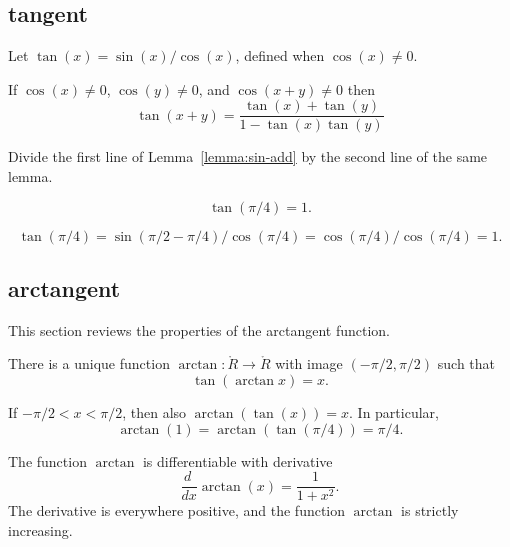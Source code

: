 \subsection{tangent}
\label{sec:tangent}

\begin{definition}[tangent]\label{def:tan}
Let $\tan(x) = \sin(x)/\cos(x)$, defined when $\cos(x)\ne0$.
\end{definition}


\begin{lemma}\label{lemma:tan-add}
    If $\cos(x)\ne 0$, $\cos(y)\ne 0$, and $\cos(x+y)\ne0$ then
    $$\tan(x+y) = \frac{\tan(x) + \tan(y) }{ 1 - \tan(x)\tan(y)}$$
\end{lemma}

\begin{proved}
  Divide the first line of Lemma~\ref{lemma:sin-add} by the second
  line of the same lemma.
\swallowed\end{proved}

\begin{lemma}\label{lemma:tan-pi4}
    $$\tan(\pi/4) = 1.$$
\end{lemma}

\begin{proved}
    $$\tan(\pi/4) = \sin(\pi/2-\pi/4)/\cos(\pi/4) =
    \cos(\pi/4)/\cos(\pi/4) = 1.$$
\swallowed\end{proved}


\subsection{arctangent}

This section reviews the properties of the arctangent function.

\begin{definition}[arctangent]\label{def:arctan}
There is a unique function $\arctan:\ring{R}\to\ring{R}$ with
image $(-\pi/2,\pi/2)$ such that
    $$\tan(\arctan x) =x.$$
\end{definition}

If $-\pi/2 < x < \pi/2$, then also $\arctan(\tan(x)) = x$. In
particular,
    $$\arctan(1) = \arctan(\tan(\pi/4)) = \pi/4.$$


The function $\arctan$ is differentiable with derivative%
    $$\frac{d\phantom{~}} {dx} \arctan(x) = \frac{1}{1 + x^2}.$$
The derivative is everywhere positive, and the function $\arctan$ is
strictly increasing.


